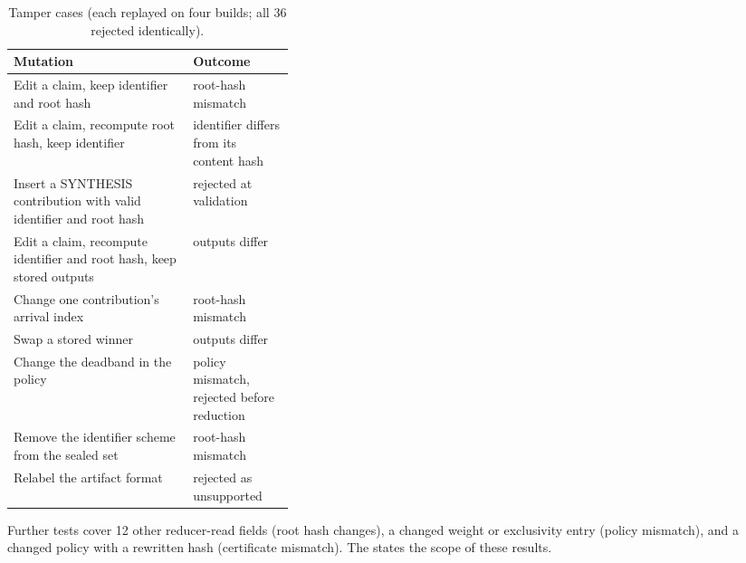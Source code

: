 \begin{table}[t]
  \centering
  \caption{Tamper cases (each replayed on four builds; all 36 rejected identically).}
  \label{tab:tamper}
  \small
  \begin{tabularx}{\linewidth}{@{}L>{\raggedright\arraybackslash}p{0.36\linewidth}@{}}
    \toprule
    Mutation & Outcome \\
    \midrule
    Edit a claim, keep identifier and root hash & root-hash mismatch \\
    Edit a claim, recompute root hash, keep identifier & identifier differs from its content hash \\
    Insert a SYNTHESIS contribution with valid identifier and root hash & rejected at validation \\
    Edit a claim, recompute identifier and root hash, keep stored outputs & outputs differ \\
    Change one contribution's arrival index & root-hash mismatch \\
    Swap a stored winner & outputs differ \\
    Change the deadband in the policy & policy mismatch, rejected before reduction \\
    Remove the identifier scheme from the sealed set & root-hash mismatch \\
    Relabel the artifact format & rejected as unsupported \\
    \bottomrule
  \end{tabularx}
\end{table}

Further tests cover 12 other reducer-read fields (root hash changes), a changed weight or exclusivity entry (policy mismatch), and a changed policy with a rewritten hash (certificate mismatch). The  states the scope of these results.
